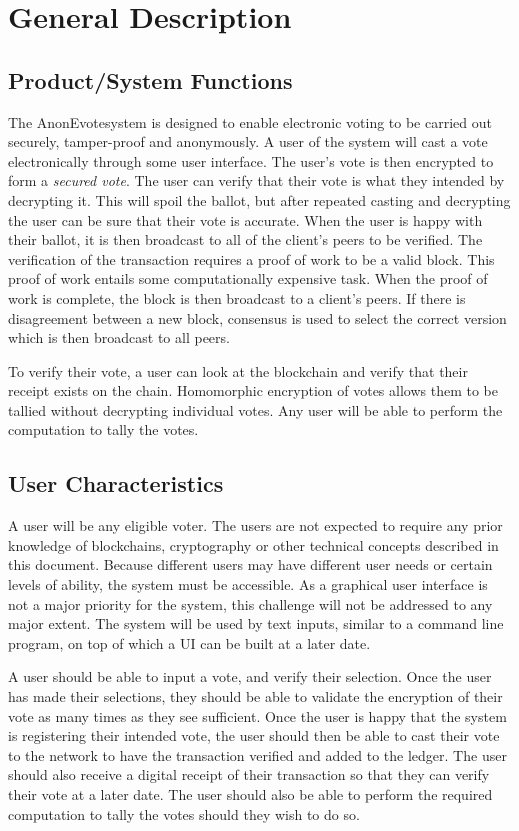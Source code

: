 \documentclass[a4paper,12pt]{article}
\newcommand{\proj}{AnonEvote}
\begin{document}
\section{General Description}
\subsection{Product/System Functions}
The \proj system is designed to enable electronic voting to be carried out securely, tamper-proof and anonymously. A user of the system will cast a vote electronically through some user interface. The user's vote is then encrypted to form a \textit{secured vote}. The user can verify that their vote is what they intended by decrypting it. This will spoil the ballot, but after repeated casting and decrypting the user can be sure that their vote is accurate. When the user is happy with their ballot, it is then broadcast to all of the client's peers to be verified. The verification of the transaction requires a proof of work to be a valid block. This proof of work entails some computationally expensive task. When the proof of work is complete, the block is then broadcast to a client's peers. If there is disagreement between a new block, consensus is used to select the correct version which is then broadcast to all peers.

To verify their vote, a user can look at the blockchain and verify that their receipt exists on the chain. Homomorphic encryption of votes allows them to be tallied without decrypting individual votes. Any user will be able to perform the computation to tally the votes.

\subsection{User Characteristics}
A user will be any eligible voter. The users are not expected to require any prior knowledge of blockchains, cryptography or other technical concepts described in this document. Because different users may have different user needs or certain levels of ability, the system must be accessible. As a graphical user interface is not a major priority for the system, this challenge will not be addressed to any major extent. The system will be used by text inputs, similar to a command line program, on top of which a UI can be built at a later date.

A user should be able to input a vote, and verify their selection. Once the user has made their selections, they should be able to validate the encryption of their vote as many times as they see sufficient. Once the user is happy that the system is registering their intended vote, the user should then be able to cast their vote to the network to have the transaction verified and added to the ledger. The user should also receive a digital receipt of their transaction so that they can verify their vote at a later date. The user should also be able to perform the required computation to tally the votes should they wish to do so.
\end{document}
